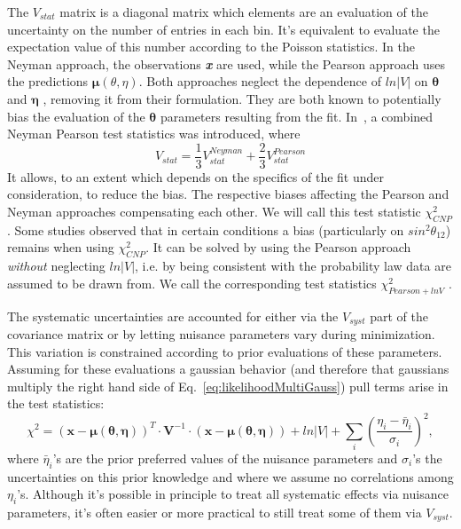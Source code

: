 The $V_{stat}$ matrix is a diagonal matrix which elements are an evaluation of the uncertainty on the number of entries in each bin. It's equivalent to evaluate the expectation value of this number according to the Poisson statistics. In the Neyman approach, the observations \textit{\textbf{x}} are used, while the Pearson approach uses the predictions $\mathbf{\mu}(\theta,\eta)$. Both approaches neglect the dependence of $ln|V|$ on $\mathbf{\theta}$ and $\mathbf{\eta}$ , removing it from their formulation. They are both known to potentially bias the evaluation of the $\mathbf{\theta}$ parameters resulting from the fit. In~\cite{Ji_2020}, a combined Neyman Pearson test statistics was introduced, where 
\begin{equation}
	V_{stat} = \frac{1}{3}V_{stat}^{Neyman}+\frac{2}{3}V_{stat}^{Pearson}
\end{equation}
It allows, to an extent which depends on the specifics of the fit under consideration, to reduce the bias. The respective biases affecting the Pearson and Neyman approaches compensating each other. We will call this test statistic $\chi^2_{CNP}$. Some studies observed that in certain conditions a bias (particularly on $sin^2\theta_{12}$) remains when using $\chi^2_{CNP}$. It can be solved by using the Pearson approach {\it without} neglecting $ln|V|$, i.e. by being consistent with the probability law data are assumed to be drawn from. We call the corresponding test statistics $\chi^2_{Pearson+lnV}$ .


The systematic uncertainties are accounted for either via the $V_{syst}$ part of the covariance matrix or by letting nuisance parameters vary during minimization. This variation is constrained according to prior evaluations of these parameters. Assuming for these evaluations a gaussian behavior (and therefore that gaussians multiply the right hand side of 
Eq.~\ref{eq:likelihoodMultiGauss}) pull terms arise in the test statistics: 
\begin{equation}
	\chi^2 =\left(\boldsymbol{x-\mu(\theta,\eta)}\right)^T\cdot \boldsymbol V^{-1}\cdot \left(\boldsymbol{x-\mu(\theta,\eta)}\right) + ln|V| + \sum_{i}\left(\frac{\eta_{i}-\bar{\eta}_i}{\sigma_{i}}\right)^{2},
	\label{eq:chi_sq}
\end{equation}
where $\bar{\eta}_i$'s are the prior preferred values of the nuisance parameters and $\sigma_i$'s
the uncertainties on this prior knowledge and where we assume no correlations among $\eta_i$'s. Although it's possible in principle to treat all systematic effects via nuisance parameters, it's often easier or more practical to still treat some of them via $V_{syst}$.

